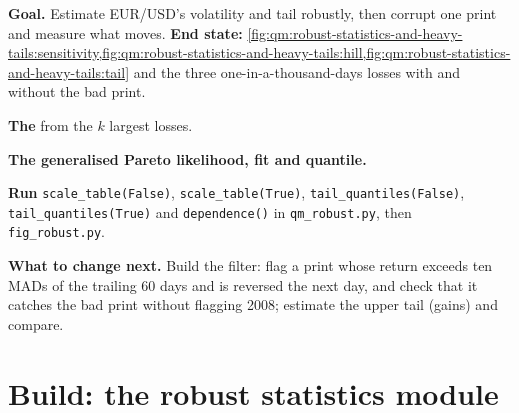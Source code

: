 \begin{tutorial}
\textbf{Goal.} Estimate EUR/USD's volatility and tail robustly, then corrupt one print and measure what moves.
\textbf{End state:} \cref{fig:qm:robust-statistics-and-heavy-tails:sensitivity,fig:qm:robust-statistics-and-heavy-tails:hill,fig:qm:robust-statistics-and-heavy-tails:tail}
and the three one-in-a-thousand-days losses with and without the bad print.
\begin{tutsteps}
\item \textbf{The } from the $k$ largest losses.
\label{lst:qm:robust-statistics-and-heavy-tails:hill}
\item \textbf{The generalised Pareto likelihood, fit and quantile.}
\label{lst:qm:robust-statistics-and-heavy-tails:gpd}
\item \textbf{Run} \texttt{scale\_table(False)}, \texttt{scale\_table(True)}, \texttt{tail\_quantiles(False)}, \texttt{tail\_quantiles(True)} and
\texttt{dependence()} in \texttt{qm\_robust.py}, then \texttt{fig\_robust.py}.
\end{tutsteps}
\textbf{What to change next.} Build the filter: flag a print whose return exceeds ten MADs of the trailing 60 days and is reversed the next
day, and check that it catches the bad print without flagging 2008; estimate the upper tail (gains) and compare.
\end{tutorial}

\section{Build: the robust statistics module}\label{bld:qm:robust-statistics-and-heavy-tails:robust}

